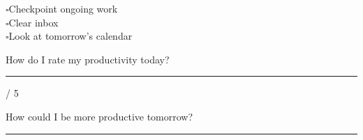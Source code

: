 \documentclass[12pt]{article}
\newcommand{\handwrite}[1]{\parbox[t]{#1}{\rule[-3pt]{\linewidth}{.4pt}}}
\newcommand{\msquare}{$\square$}
\begin{document}
\dotfill
\vspace{0.5\baselineskip}

\begin{minipage}{0.4\linewidth}
\msquare Checkpoint ongoing work\\
\msquare Clear inbox\\
\msquare Look at tomorrow's calendar
\end{minipage}
\begin{minipage}{0.6\linewidth}
How do I rate my productivity today? \handwrite{1cm} / 5

How could I be more productive tomorrow?\\
\handwrite{0.9\linewidth}
\end{minipage}

\vspace{\baselineskip}
\dotfill
\end{document}
